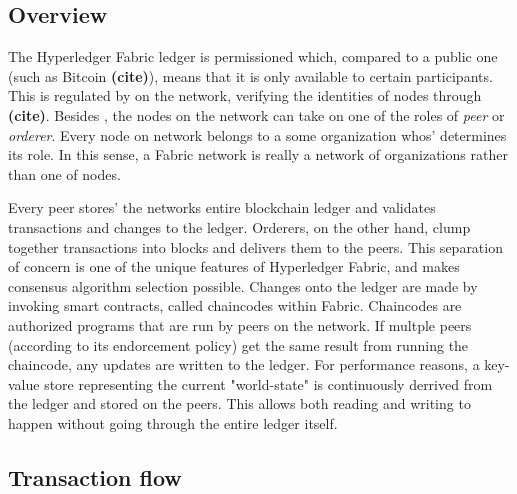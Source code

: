 \documentclass[english, biblatex, digitaloutput]{kththesis}
\begin{document}
\subsection{Overview}

The Hyperledger Fabric ledger is permissioned which, compared to a public one (such as Bitcoin \textbf{(cite)}), means that it is only available to certain participants. This is regulated by  on the network, verifying the identities of nodes through  \textbf{(cite)}. Besides , the nodes on the network can take on one of the roles of \textit{peer} or \textit{orderer}. Every node on network belongs to a some organization whos'  determines its role. In this sense, a Fabric network is really a network of organizations rather than one of nodes.

Every peer stores' the networks entire blockchain ledger and validates transactions and changes to the ledger. Orderers, on the other hand, clump together transactions into blocks and delivers them to the peers. This separation of concern is one of the unique features of Hyperledger Fabric, and makes consensus algorithm selection possible. Changes onto the ledger are made by invoking smart contracts, called chaincodes within Fabric. Chaincodes are authorized programs that are run by peers on the network. If multple peers (according to its endorcement policy) get the same result from running the chaincode, any updates are written to the ledger. For performance reasons, a key-value store representing the current "world-state" is continuously derrived from the ledger and stored on the peers. This allows both reading and writing to happen without going through the entire ledger itself.



\subsection{Transaction flow}
\label{subsec:transaction-flow}
\end{document}
